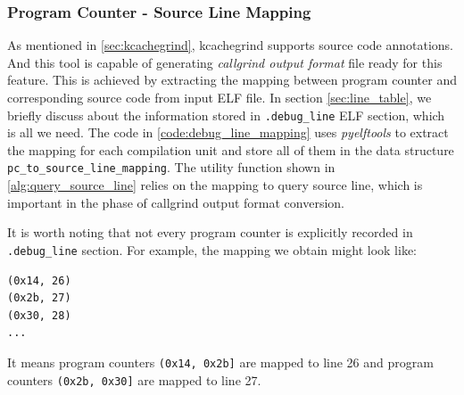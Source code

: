 \subsubsection{Program Counter - Source Line Mapping}
\label{sec:pc_line_mapping}

As mentioned in \cref{sec:kcachegrind}, kcachegrind supports source code annotations. And this tool is capable of generating \textit{callgrind output format} file ready for this feature. This is achieved by extracting the mapping between program counter and corresponding source code from input ELF file. In section \cref{sec:line_table}, we briefly discuss about the information stored in \texttt{.debug\_line} ELF section, which is all we need. The code in  \cref{code:debug_line_mapping} uses \textit{pyelftools} to extract the mapping for each compilation unit and store all of them in the data structure \texttt{pc\_to\_source\_line\_mapping}. The utility function shown in \cref{alg:query_source_line} relies on the mapping to query source line, which is important in the phase of callgrind output format conversion.

It is worth noting that not every program counter is explicitly recorded in \texttt{.debug\_line} section. For example, the mapping we obtain might look like:

\medskip
\begin{center}
\begin{minipage}{\textwidth}
\begin{lstlisting}
(0x14, 26)
(0x2b, 27)
(0x30, 28)
...

\end{lstlisting}
\end{minipage}
\end{center}

It means program counters \texttt{(0x14, 0x2b]} are mapped to line 26 and program counters \texttt{(0x2b, 0x30]} are mapped to line 27.

